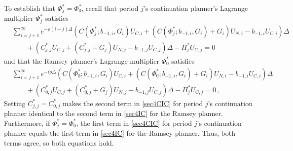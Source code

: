\documentclass[12pt]{article}
\newcommand{\NW}[1]{{\textcolor{blue}{#1}}}
\begin{document}
To establish that  $\Phi_j^*=\Phi_0^*$, recall that period $j$'s continuation planner's Lagrange multiplier $\Phi_j^*$ satisfies 
\begin{align}
&\sum_{i=j+1}^{\infty} e^{-\rho(i-j) \Delta} \left(  C(\Phi_j^*; b_{-1, i}, G_i)U_{C, i} + (C(\Phi_j^*; b_{-1, i}, G_i)+G_{i})U_{N, i} -b_{-1, i} U_{C, i} \right) \Delta \nonumber \\
& \quad\quad + \left (C_{j, j}^*U_{C, j} + (C_{j, j}^*+G_{j})U_{N, j} - b_{-1,j} U_{C, j} \right)\Delta -\Pi_{{j}}^*U_{C, j} =0 \, \tag{CIC} \label{sec4CIC}
\end{align}
and that the Ramsey planner's Lagrange multiplier $\Phi_0^*$ satisfies 
\begin{align}
&\sum_{i=j+1}^{\infty} e^{-i \rho \Delta} \left(  C(\Phi_0^*; b_{-1, i}, G_i)U_{C, i} + (C(\Phi_0^*; b_{-1, i}, G_i)+G_{i})U_{N, i} -b_{-1, i} U_{C, i} \right) \Delta \nonumber\\
& \quad \quad +  \left (C_{0, j}^*U_{C, j} + (C_{0, j}^*+G_{j})U_{N, j} - b_{-1,j} U_{C, j} \right)\Delta -\Pi_{{j}}^*U_{C, j} =0
\,,\tag{IC} \label{sec4IC}	
\end{align}
Setting $C_{j, j}^*=C_{0, j}^*$ makes the second term in   \eqref{sec4CIC} for period $j$'s continuation planner  identical to the second term in \eqref{sec4IC} for the Ramsey planner. 
Furthermore, if    $\Phi_j^*=\Phi_0^*$,
the  first term in   \eqref{sec4CIC}  for period $j$'s continuation planner  equals the first term in \eqref{sec4IC} for the Ramsey planner. Thus,  both terms agree, so  
both equations hold.  
%
%
%
%

\end{document}
